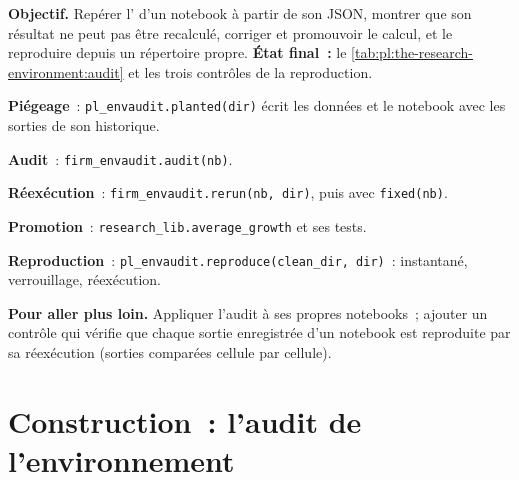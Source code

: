 \begin{tutorial}
\textbf{Objectif.} Repérer l' d'un notebook à partir de son JSON, montrer que son résultat ne peut pas être recalculé, corriger et promouvoir le calcul, et
le reproduire depuis un répertoire propre. \textbf{État final~:} le \cref{tab:pl:the-research-environment:audit} et les trois contrôles de la reproduction.
\begin{tutsteps}
\item \textbf{Piégeage}~: \texttt{pl\_envaudit.planted(dir)} écrit les données et le notebook avec les sorties de son historique.
\item \textbf{Audit}~: \texttt{firm\_envaudit.audit(nb)}.
\item \textbf{Réexécution}~: \texttt{firm\_envaudit.rerun(nb, dir)}, puis avec \texttt{fixed(nb)}.
\item \textbf{Promotion}~: \texttt{research\_lib.average\_growth} et ses tests.
\item \textbf{Reproduction}~: \texttt{pl\_envaudit.reproduce(clean\_dir, dir)}~: instantané, verrouillage, réexécution.
\end{tutsteps}
\textbf{Pour aller plus loin.} Appliquer l'audit à ses propres notebooks~; ajouter un contrôle qui vérifie que chaque sortie enregistrée d'un notebook est reproduite par sa
réexécution (sorties comparées cellule par cellule).
\end{tutorial}

\section{Construction~: l'audit de l'environnement}\label{bld:pl:the-research-environment:envaudit}

